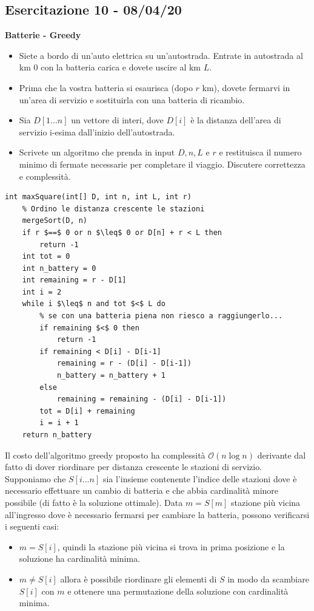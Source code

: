 \documentclass[../cheatSheetAlgoritmi.tex]{subfiles}
\begin{document}
\subsection{Esercitazione 10 - 08/04/20}
\textbf{Batterie - Greedy}
\begin{itemize}
	\item Siete a bordo di un'auto elettrica su un'autostrada. Entrate in autostrada al km 0 con la batteria carica e dovete uscire al km $L$.
	\item Prima che la vostra batteria si esaurisca (dopo $r$ km), dovete fermarvi in un'area di servizio e sostituirla con una batteria di ricambio.
	\item Sia $D[1...n]$ un vettore di interi, dove $D[i]$ è la distanza dell'area di servizio i-esima dall'inizio dell'autostrada.
	\item Scrivete un algoritmo che prenda in input $D,n,L$ e $r$ e restituisca il numero minimo di fermate necessarie per completare il viaggio. Discutere correttezza e complessità.
\end{itemize}
\begin{lstlisting}[caption=Batterie Greedy]
int maxSquare(int[] D, int n, int L, int r)
	% Ordino le distanza crescente le stazioni
	mergeSort(D, n)
	if r $==$ 0 or n $\leq$ 0 or D[n] + r < L then
		return -1
	int tot = 0
	int n_battery = 0
	int remaining = r - D[1]
	int i = 2
	while i $\leq$ n and tot $<$ L do
		% se con una batteria piena non riesco a raggiungerlo...
		if remaining $<$ 0 then
			return -1
		if remaining < D[i] - D[i-1]
			remaining = r - (D[i] - D[i-1])
			n_battery = n_battery + 1
		else
			remaining = remaining - (D[i] - D[i-1])
		tot = D[i] + remaining
		i = i + 1
	return n_battery
\end{lstlisting}
Il costo dell'algoritmo greedy proposto ha complessità $\mathcal{O}(n \log n)$ derivante dal fatto di dover riordinare per distanza crescente le stazioni di servizio. Supponiamo che $S[i...n]$ sia l'insieme contenente l'indice delle stazioni dove è necessario effettuare un cambio di batteria e che abbia cardinalità minore possibile (di fatto è la soluzione ottimale). Data $m = S[m]$ stazione più vicina all'ingresso dove è necessario fermarsi per cambiare la batteria, possono verificarsi i seguenti casi:
\begin{itemize}
	\item $m = S[i]$, quindi la stazione più vicina si trova in prima posizione e la soluzione ha cardinalità minima.
	\item $m \neq S[i]$ allora è possibile riordinare gli elementi di $S$ in modo da scambiare $S[i]$ con $m$ e ottenere una permutazione della soluzione con cardinalità minima.
\end{itemize}
\end{document}

